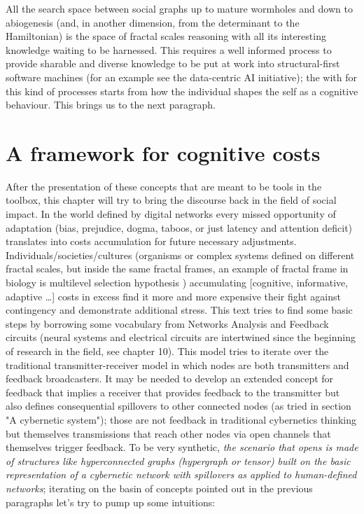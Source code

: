 \documentclass[14pt]{extarticle}
\begin{document}
\newline
\hspace*{15mm}All the search space between social graphs up to mature wormholes and down to abiogenesis (and, in another dimension, from the determinant to the Hamiltonian) is the space of fractal scales reasoning with all its interesting knowledge waiting to be harnessed. This requires a well informed process to provide sharable and diverse knowledge to be put at work into structural-first software machines (for an example see the data-centric AI initiative); the with for this kind of processes starts from how the individual shapes the self as a cognitive behaviour. This brings us to the next paragraph.

\section*{A framework for cognitive costs}
\label{sec:costs}%

\hspace*{15mm}After the presentation of these concepts that are meant to be tools in the toolbox, this chapter will try to bring the discourse back in the field of social impact. In the world defined by digital networks every missed opportunity of adaptation (bias, prejudice, dogma, taboos, or just latency and attention deficit) translates into costs accumulation for future necessary adjustments.
\newline
\hspace*{15mm}Individuals/societies/cultures (organisms or complex systems defined on different fractal scales, but inside the same fractal frames, an example of fractal frame in biology is multilevel selection hypothesis \cite{doi:10.1111,10.1086/286046}) accumulating [cognitive, informative, adaptive …] costs in excess find it more and more expensive their fight against contingency and demonstrate additional stress. This text tries to find some basic steps by borrowing some vocabulary from Networks Analysis \cite{BRANDESnetwork} and Feedback circuits (neural systems and electrical circuits are intertwined since the beginning of research in the field, see \cite{heims1980john} chapter 10).
\newline
This model tries to iterate over the traditional transmitter-receiver model in which nodes are both transmitters and feedback broadcasters. It may be needed to develop an extended concept for feedback that implies a receiver that provides feedback to the transmitter but also defines consequential spillovers to other connected nodes (as tried in section "A cybernetic system"); those are not feedback in traditional cybernetics thinking but themselves transmissions that reach other nodes via open channels that themselves trigger feedback. To be very synthetic, \textit{the scenario that opens is made of structures like hyperconnected graphs (hypergraph or tensor) built on the basic representation of a cybernetic network with spillovers as applied to human-defined networks}; iterating on the basin of concepts pointed out in the previous paragraphs let’s try to pump up some intuitions:
\end{document}
